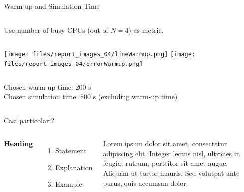 \documentclass[aspectratio=169,xcolor=dvipsnames]{beamer}
\begin{document}
\begin{frame}{Warm-up and Simulation Time}
    \begin{columns}[c]
        Use number of busy CPUs (out of $N = 4$) as metric.
    \end{columns}
    \begin{columns}[c] %
        \texttt{[image: files/report\_images\_04/lineWarmup.png]}
        \texttt{[image: files/report\_images\_04/errorWarmup.png]}
    \end{columns}
    \begin{columns}[c]
        \begin{block}{}
            Chosen warm-up time: 200 s\\
            Chosen simulation time: 800 s (excluding warm-up time)
        \end{block}
    \end{columns}
\end{frame}


\begin{frame}{Casi particolari?}
    \begin{columns}[c] %

        \textbf{Heading}
        \begin{enumerate}
            \item Statement
            \item Explanation
            \item Example
        \end{enumerate}

        Lorem ipsum dolor sit amet, consectetur adipiscing elit. Integer lectus nisl, ultricies in feugiat rutrum, porttitor sit amet augue. Aliquam ut tortor mauris. Sed volutpat ante purus, quis accumsan dolor.

    \end{columns}
\end{frame}
\end{document}
